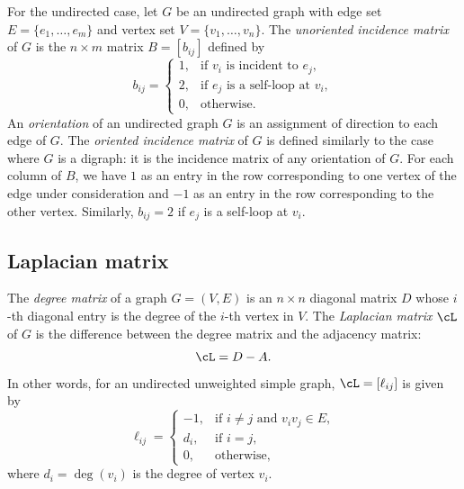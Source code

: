 For the undirected case, let $G$ be an undirected graph with edge set
$E = \{ e_1, \dots, e_m \}$ and vertex set
$V = \{ v_1, \dots, v_n \}$. The
\emph{unoriented incidence matrix}
of $G$ is the $n \times m$ matrix $B = [b_{ij}]$ defined by
\[
b_{ij}
=
\begin{cases}
1, & \text{if $v_i$ is incident to $e_j$}, \\[4pt]
2, & \text{if $e_j$ is a self-loop at $v_i$}, \\[4pt]
0, & \text{otherwise}.
\end{cases}
\]
An \emph{orientation} of an undirected graph $G$ is
an assignment of direction to each edge of $G$. The
\emph{oriented incidence matrix} of
$G$ is defined similarly to the case where $G$ is a digraph: it is the
incidence matrix of any orientation of $G$. For each column of $B$, we
have $1$ as an entry in the row corresponding to one vertex of the
edge under consideration and $-1$ as an entry in the row corresponding
to the other vertex. Similarly, $b_{ij} = 2$ if $e_j$ is a self-loop
at $v_i$.

%



\subsection{Laplacian matrix}

The \emph{degree matrix} of a graph $G = (V,E)$
is an $n \times n$ diagonal matrix $D$ whose $i$-th diagonal entry is
the degree of the $i$-th vertex in $V$. The
\emph{Laplacian matrix} $\cL$\index{$\cL$} of
$G$ is the difference between the degree matrix and the adjacency
matrix:
\[
\cL = D - A.
\]
In other words, for an undirected unweighted simple graph,
$\cL = [\ell_{ij}]$ is given by
\[
\ell_{ij}
=
\begin{cases}
-1,  & \text{if $i \neq j$ and $v_i v_j \in E$}, \\[4pt]
d_i, & \text{if $i = j$}, \\[4pt]
0,   & \text{otherwise},
\end{cases}
\]
where $d_i = \deg(v_i)$ is the degree of vertex $v_i$.

